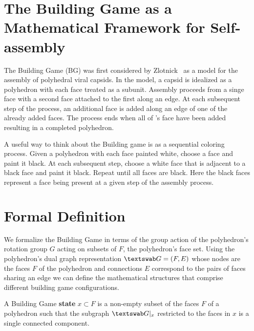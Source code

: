
\section{The Building Game as a Mathematical Framework for Self-assembly}

The Building Game (BG) was first considered by Zlotnick~\cite{Zlotnick1994} as a model for the assembly of polyhedral viral capsids. In the model, a capsid is idealized as a polyhedron \poly\spc with each face treated as a subunit. Assembly proceeds from a singe face with a second face attached to the first along an edge. At each subsequent step of the process, an additional face is added along an edge of one of the already added faces. The process ends when all of \poly's face have been added resulting in a completed polyhedron.

A useful way to think about the Building game is as a sequential coloring process. Given a polyhedron with each face painted white, choose a face and paint it black. At each subsequent step, choose a white face that is adjacent to a black face and paint it black. Repeat until all faces are black. Here the black faces represent a face being present at a given step of the assembly process.

\section{Formal Definition}
We formalize the Building Game in terms of the group action of the polyhedron's rotation group $G$ acting on subsets of $F$, the polyhedron's face set. Using the polyhedron's dual graph representation $\PolyGraph = \left(F, E\right)$ whose nodes are the faces $F$ of the polyhedron and connections $E$ correspond to the pairs of faces sharing an edge we can define the mathematical structures that comprise different building game configurations.


\begin{mydef}
  A Building Game \textbf{state} $x \subset F$ is a non-empty subset of the faces $F$ of a polyhedron such that the subgraph $\PolyGraph|_x$ restricted to the faces in $x$ is a single connected component. 
\end{mydef} 

